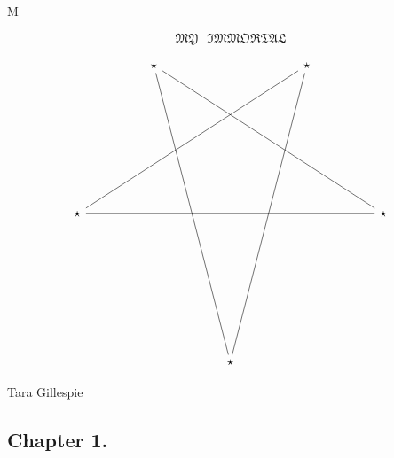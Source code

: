M\documentclass{article}
\begin{document}
\newcommand{\textbreak}{\medskip\par\noindent\large\centerline{*\quad*\quad*}\normalsize\par}%






\begin{center}
\begin{LARGE}
$$\mathfrak{MY}\textrm{ }\mathfrak{IMMORTAL}$$
\end{LARGE}
\begin{large}
$$
\begin{tikzcd}
& & \star \arrow[rrdddddddddddd, dash] \arrow[rrrrrrdddddd, dash] & & & & \star \arrow[lldddddddddddd, dash] \arrow[lllllldddddd, dash]\\
\\
\\
\\
\\
\\
\star \arrow[rrrrrrrr, dash] & & & & & & & & \star\\
\\
\\
\\
\\
\\
& & & & \star
\end{tikzcd}
$$

Tara Gillespie
\end{large}
\end{center}
\clearpage

\subsection*{Chapter 1.}
\end{document}
